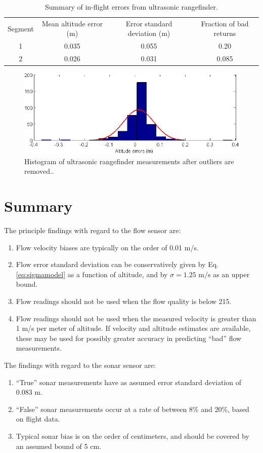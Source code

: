 \documentclass{article}
\begin{document}
\begin{table}
\centering
\begin{tabular}{c|c|c|c}
Segment & Mean altitude error (m) & Error standard deviation (m)& Fraction of bad returns\\
1 & 0.035 & 0.055 & 0.20\\
2 & 0.026 & 0.031 & 0.085\\
\end{tabular}
\caption{Summary of in-flight errors from ultrasonic rangefinder.}
\label{tab:altErrs}
\end{table}

\begin{figure}[tb!]
\centering
\includegraphics[width=\textwidth]{../moving_flying_alt_hist.png}
\caption{Histogram of ultrasonic rangefinder measurements after outliers are removed..}
\label{fig:movingflyingalthist}
\end{figure}

\section{Summary}

The principle findings with regard to the flow sensor are:

\begin{enumerate}
\item Flow velocity biases are typically on the order of 0.01 m/s.
\item Flow error standard deviation can be conservatively given by Eq. \ref{eq:sigmamodel} as a function of altitude, and by $\sigma = 1.25$ m/s as an upper bound.
\item Flow readings should not be used when the flow quality is below 215.
\item Flow readings should not be used when the measured velocity is greater than 1 m/s per meter of altitude. If velocity and altitude estimates are available, these may be used for possibly greater accuracy in predicting ``bad'' flow measurements.
\end{enumerate}

The findings with regard to the sonar sensor are:

\begin{enumerate}
\item ``True'' sonar measurements have as assumed error standard deviation of 0.083 m.
\item ``False'' sonar measurements occur at a rate of between 8\% and 20\%, based on flight data.
\item Typical sonar bias is on the order of centimeters, and should be covered by an assumed bound of 5 cm.
\end{enumerate}

\printbibliography
\end{document}

